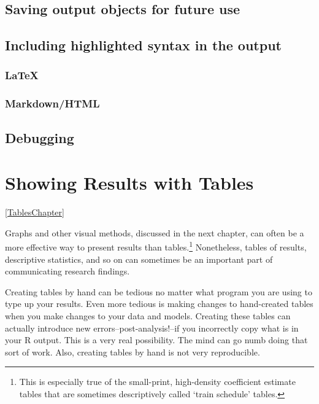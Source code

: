 \documentclass[ChapterTOCs,krantz1]{krantz}\usepackage{graphicx, color}
\begin{document}
\section{Saving output objects for future use}

\section{Including highlighted syntax in the output}

\subsection{\LaTeX}

\subsection{Markdown/HTML}

\section{Debugging}





\chapter{Showing Results with Tables}\ref{TablesChapter}

Graphs and other visual methods, discussed in the next chapter, can
often be a more effective way to present results than tables.\footnote{This
  is especially true of the small-print, high-density coefficient
  estimate tables that are sometimes descriptively called `train
  schedule' tables.} Nonetheless, tables of results, descriptive statistics,
and so on can sometimes be an important part of communicating
research findings.

Creating tables by hand can be tedious no matter what program you are
using to type up your results. Even more tedious is making changes to
hand-created tables when you make changes to your data and models.
Creating these tables can actually introduce new
errors--post-analysis!--if you incorrectly copy what is in your
R output. This is a very real possibility. The mind can go numb
doing that sort of work. Also, creating tables by hand is not very
reproducible.
\end{document}
